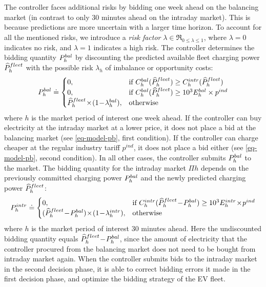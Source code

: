 \documentclass[a4paper, 12pt]{article}
\begin{document}
The controller faces additional risks by bidding one week ahead on the balancing
market (in contrast to only 30 minutes ahead on the intraday market). This is
because predictions are more uncertain with a larger time horizon. To account
for all the mentioned risks, we introduce a \emph{risk factor} \(\lambda \in \Re_{0
\leq \lambda \leq 1}\), where \(\lambda\!=\!0\) indicates no risk, and
\(\lambda\!=\!1\) indicates a high risk. The controller determines the bidding
quantity \(P^{bal}_{h}\) by discounting the predicted available fleet charging power
\(\widehat{P}^{fleet}_{h}\) with the possible risk \(\lambda_{h}\) of imbalance or opportunity
costs:
\begin{equation} \label{eq-model-pb}
  P^{bal}_{h} \doteq
  \begin{cases}
    0, & \text{if}\ C^{bal}_{h}(\widehat{P}^{fleet}_{h}) \geq C^{intr}_{h}(\widehat{P}^{fleet}_{h})\\
    0, & \text{if}\ C^{bal}_{h}(\widehat{P}^{fleet}_{h}) \geq 10^3E^{bal}_{h} \times p^{ind}\\
    \widehat{P}^{fleet}_{h}\!\times\!(1\!-\!\lambda^{bal}_{h}), & \text{otherwise}
  \end{cases}
\end{equation}
where \(h\) is the market period of interest one week ahead. If the controller can
buy electricity at the intraday market at a lower price, it does not place a bid
at the balancing market (see \eqref{eq-model-pb}, first condition). If the
controller can charge cheaper at the regular industry tariff \(p^{ind}\), it does
not place a bid either (see \eqref{eq-model-pb}, second condition). In all other
cases, the controller submits \(P^{bal}_{h}\) to the market. The bidding quantity for
the intraday market \(\Pi{h}\) depends on the previously committed charging power
\(P^{bal}_{h}\) and the newly predicted charging power \(\widehat{P}^{fleet}_{h}\):
\begin{equation} \label{eq-model-pi}
  \Pi{h} \defeq
  \begin{cases}
    0, & \text{if}\ \Ci{h}(\fPhat{h}\!-\!\Pb{h}) \geq 10^3\Ei{h}\!\times\!p^{ind}\\
    (\fPhat{h}\!-\!\Pb{h})\!\times\!(1\!-\!\li{h}), & \text{otherwise}
  \end{cases}
\end{equation}
where \(h\) is the market period of interest 30 minutes ahead. Here the
undiscounted bidding quantity equals \(\widehat{P}^{fleet}_{h}\!-\!P^{bal}_{h}\), since the amount of
electricity that the controller procured from the balancing market does not need
to be bought from intraday market again. When the controller submits bids to the
intraday market in the second decision phase, it is able to correct bidding
errors it made in the first decision phase, and optimize the bidding strategy of
the EV fleet.
\end{document}
